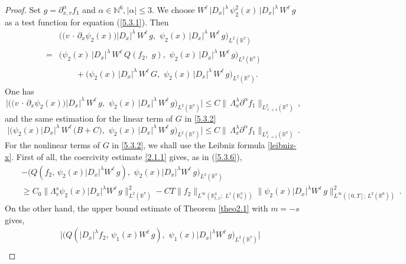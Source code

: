 \documentclass{amsart}[12pt, article]
\begin{document}
\begin{proof} Set $ g=\partial^\alpha_{x, v} f_1$ and $\alpha\in{{\mathbb N}}^6, |\alpha|\leq 3$. We choose
$W^{\ell}\,|D_{x}|^{\lambda}\,\psi^2_2(x)\, |D_{x}|^{\lambda}\,
W^{\ell}\,g $ as a test function for equation (\ref{5.3.1}). Then
\begin{align*}
&\Big( \big(v\,\cdot\,\partial_x\psi_2(x)\big) |D_{x}|^{\lambda}\,
W^{\ell}\,g,\,\,\psi_2(x)\,
|D_{x}|^{\lambda}\, W^{\ell}\,g \Big)_{L^2({{{\mathbb R}}}^7)} \\
=&\Big(\psi_2(x)\, |D_{x}|^{\lambda}\, W^{\ell}\,Q(f_2,\,\,
g),\,\,\psi_2(x)\, |D_{x}|^{\lambda}\, W^{\ell}\,g
\Big)_{L^2({{{\mathbb R}}}^7)}\\%
&\qquad+ \Big( \psi_2(x)\, |D_{x}|^{\lambda}\,
W^{\ell}\,G,\,\,\psi_2(x)\, |D_{x}|^{\lambda}\, W^{\ell}\,g
\Big)_{L^2({{{\mathbb R}}}^7)}. 
\end{align*}
One has
$$
\Big| \Big( \big(v\,\cdot\,\partial_x\psi_2(x)\big)
|D_{x}|^{\lambda}\, W^{\ell}\,g,\,\,\psi_2(x)\, |D_{x}|^{\lambda}\,
W^{\ell}\,g \Big)_{L^2({{{\mathbb R}}}^7)}\Big| \leq C \|\,\Lambda_{x}^{\lambda}
\partial^\alpha f_1\|_{L^2_{\ell+1}({{{\mathbb R}}}^7)}\, ,
$$
and the same estimation for the linear term of $G$ in \eqref{5.3.2}
$$
\Big| \Big( \psi_2(x) |D_{x}|^{\lambda}\,
W^{\ell}\,\big(B+C\big),\,\,\psi_2(x)\, |D_{x}|^{\lambda}\,
W^{\ell}\,g \Big)_{L^2({{{\mathbb R}}}^7)}\Big| \leq C \|\,\Lambda_{x}^{\lambda}
\partial^\alpha f_1\|_{L^2_{\ell+1}({{{\mathbb R}}}^7)}\, .
$$
For the nonlinear terms of $G$ in \eqref{5.3.2},  we shall use  the
Leibniz formula \eqref{leibniz-x}. First of all, the coercivity
estimate \eqref{2.1.1} gives, as in (\ref{5.3.6}),
\begin{eqnarray*}
&&-\Big(Q({f_2},\, \psi_2(x)|D_{x}|^{\lambda} W^{\ell}\, g),\,\,
\psi_2(x)|D_{x}|^{\lambda} W^{\ell}\,
g\Big)_{L^2({{{\mathbb R}}}^7)} \\
&&\geq C_0\|\Lambda^{s}_v \psi_2(x)|D_{x}|^{\lambda} W^{\ell}\,
g\|^2_{L^2({{{\mathbb R}}}^7)}- C T\| {f_2}\|_{L^\infty({{{\mathbb R}}}^4_{t, x};\,\,
L^1({{{\mathbb R}}}^3_v))}\|\psi_2(x)|D_{x}|^{\lambda}W^{\ell}\,g\|^2_{L^\infty([0,
T];\, L^2({{{\mathbb R}}}^6))}\,.
\end{eqnarray*}
On the other hand, the upper bound estimate of Theorem \ref{theo2.1} with
$m=-s$ gives,
\begin{eqnarray*}
&&\Big|\Big(Q(|D_{x}|^{\lambda}f_2,\, \psi_1(x) W^{\ell}\, g),\,\,
\psi_1(x)|D_{x}|^{\lambda} W^{\ell}\, g\Big)_{L^2({{{\mathbb R}}}^7)}\Big|
\\

\end{eqnarray*}
\end{proof}
\end{document}
